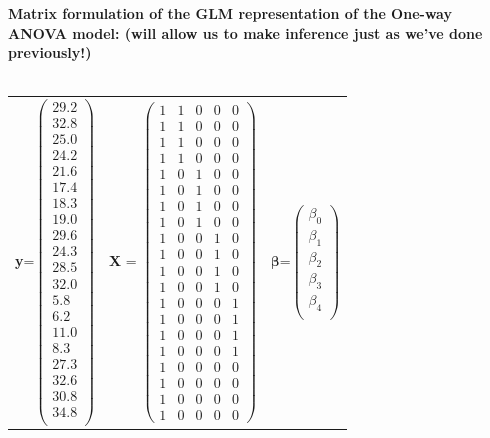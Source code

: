 \Large\textbf{Matrix formulation of the GLM representation of the One-way ANOVA model: (will allow us to make inference just as we've done previously!)}\large\\~\\
\begin{center}
\begin{tabular}{ccc}
\textbf{y}=$\left(\begin{array}{c} 29.2\\32.8\\25.0\\24.2\\21.6\\17.4\\18.3\\19.0\\29.6\\24.3\\28.5\\32.0\\5.8\\6.2\\11.0\\8.3\\27.3\\32.6\\30.8\\34.8\\\end{array}\right)$ &
\textbf{X} = $\left(\begin{array}{ccccc}
1 & 1 & 0 & 0 & 0 \\
1 & 1 & 0 & 0 & 0 \\
1 & 1 & 0 & 0 & 0 \\
1 & 1 & 0 & 0 & 0 \\
1 & 0 & 1 & 0 & 0 \\
1 & 0 & 1 & 0 & 0 \\
1 & 0 & 1 & 0 & 0 \\
1 & 0 & 1 & 0 & 0 \\
1 & 0 & 0 & 1 & 0 \\
1 & 0 & 0 & 1 & 0 \\
1 & 0 & 0 & 1 & 0 \\
1 & 0 & 0 & 1 & 0 \\
1 & 0 & 0 & 0 & 1 \\
1 & 0 & 0 & 0 & 1 \\
1 & 0 & 0 & 0 & 1 \\
1 & 0 & 0 & 0 & 1 \\
1 & 0 & 0 & 0 & 0 \\
1 & 0 & 0 & 0 & 0 \\
1 & 0 & 0 & 0 & 0 \\
1 & 0 & 0 & 0 & 0
\end{array}\right)$ &
$\boldsymbol{\beta}$=$\left(\begin{array}{c} \beta_0 \\\beta_1\\\beta_2\\\beta_3\\\beta_4\\\end{array}\right)$ 
\end{tabular}
\end{center}

